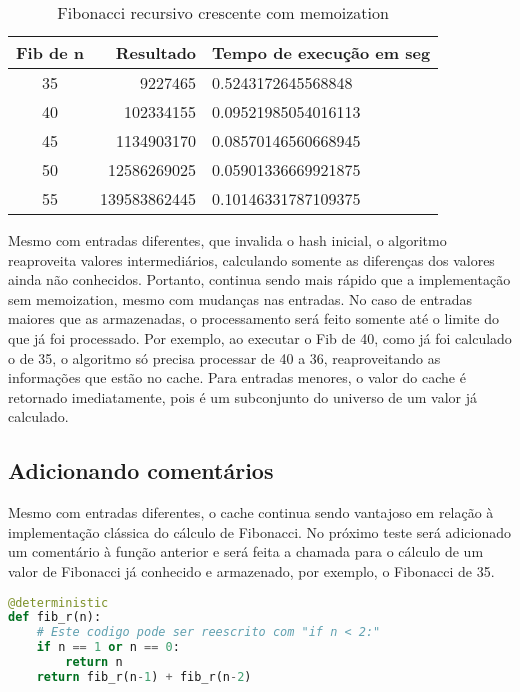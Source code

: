 \documentclass[sigconf]{acmart}
\begin{document}
\begin{table}[H]
  \caption{Fibonacci recursivo crescente com memoization}
  \label{tab:fibrccache2}
  \begin{tabular}{crl}
    \toprule
    Fib de n & Resultado & Tempo de execução em seg\\
    \midrule
    35 & 9227465 & 0.5243172645568848\\
    40 & 102334155 & 0.09521985054016113\\
    45 & 1134903170 & 0.08570146560668945\\
    50 & 12586269025 & 0.05901336669921875\\
    55 & 139583862445 & 0.10146331787109375\\
  \bottomrule
\end{tabular}
\end{table}

Mesmo com entradas diferentes, que invalida o hash inicial, o algoritmo reaproveita valores intermediários, calculando somente as diferenças dos valores ainda não conhecidos. Portanto, continua sendo mais rápido que a implementação sem memoization, mesmo com mudanças nas entradas. No caso de entradas maiores que as armazenadas, o processamento será feito somente até o limite do que já foi processado. Por exemplo, ao executar o Fib de 40, como já foi calculado o de 35, o algoritmo só precisa processar de 40 a 36, reaproveitando as informações que estão no cache. Para entradas menores, o valor do cache é retornado imediatamente, pois é um subconjunto do universo de um valor já calculado.

\subsection{Adicionando comentários}
Mesmo com entradas diferentes, o cache continua sendo vantajoso em relação à implementação clássica do cálculo de Fibonacci. No próximo teste será adicionado um comentário à função anterior e será feita a chamada para o cálculo de um valor de Fibonacci já conhecido e armazenado, por exemplo, o Fibonacci de 35.

\renewcommand{\lstlistingname}{Código}
\begin{lstlisting}[language=Python, caption=Fibonacci recursivo com memoization comentado]
@deterministic
def fib_r(n):
    # Este codigo pode ser reescrito com "if n < 2:"
    if n == 1 or n == 0:
        return n
    return fib_r(n-1) + fib_r(n-2)
\end{lstlisting}
\end{document}
